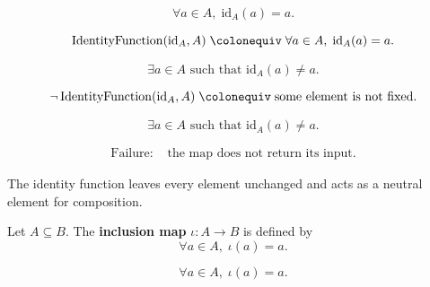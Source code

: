 \begin{remark*}
\[
\forall a \in A,\; \mathrm{id}_A(a) = a.
\]
\end{remark*}

\begin{remark*}
\[
\operatorname{IdentityFunction}(\mathrm{id}_A,A)
\;\colonequiv\;
\forall a \in A,\; \mathrm{id}_A(a) = a.
\]
\end{remark*}

\begin{remark*}
\[
\exists a \in A \text{ such that } \mathrm{id}_A(a) \ne a.
\]
\end{remark*}

\begin{remark*}
\[
\neg \operatorname{IdentityFunction}(\mathrm{id}_A,A)
\;\colonequiv\;
\text{some element is not fixed}.
\]
\end{remark*}

\begin{remark*}
\[
\exists a \in A \text{ such that } \mathrm{id}_A(a) \ne a.
\]
\end{remark*}

\begin{remark*}
\[
\begin{aligned}
\text{Failure: } 
&\text{the map does not return its input}.
\end{aligned}
\]
\end{remark*}

\begin{remark*}[Interpretation]
The identity function leaves every element unchanged and acts as a neutral
element for composition.
\end{remark*}


\begin{tcolorbox}[title={Definition --- Inclusion Map}]
\begin{definition}
\label{def:alg-inclusion}
Let $A \subseteq B$. The \textbf{inclusion map} $\iota : A \to B$ is defined by
\[
\forall a \in A,\; \iota(a) = a.
\]
\end{definition}
\end{tcolorbox}

\begin{remark*}
\[
\forall a \in A,\; \iota(a) = a.
\]
\end{remark*}

